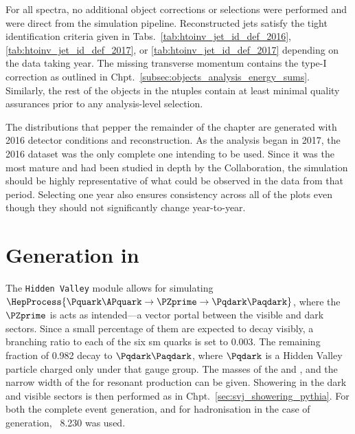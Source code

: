 For all spectra, no additional object corrections or selections were performed and were direct from the simulation pipeline. Reconstructed \glspl{jet} satisfy the tight identification criteria given in Tabs.~\ref{tab:htoinv_jet_id_def_2016}, \ref{tab:htoinv_jet_id_def_2017}, or \ref{tab:htoinv_jet_id_def_2017} depending on the data taking year. The missing transverse momentum \ptmiss contains the type-I correction as outlined in Chpt.~\ref{subsec:objects_analysis_energy_sums}. Similarly, the rest of the objects in the ntuples contain at least minimal quality assurances prior to any analysis-level selection.

The distributions that pepper the remainder of the chapter are generated with 2016 detector conditions and reconstruction. As the analysis began in 2017, the 2016 dataset was the only complete one intending to be used. Since it was the most mature and had been studied in depth by the Collaboration, the simulation should be highly representative of what could be observed in the data from that period. Selecting one year also ensures consistency across all of the plots even though they should not significantly change year-to-year.




\section{Generation in \texorpdfstring{\PYTHIA}{Pythia}}
\label{sec:svj_signal_pythia}

The \texttt{Hidden Valley} module allows for simulating $\HepProcess{\Pquark\APquark \to \PZprime \to \Pqdark\Paqdark}$, where the $\PZprime$ is acts as intended---a vector portal between the visible and dark sectors. Since a small percentage of them are expected to decay visibly, a branching ratio to each of the six \acrshort{sm} quarks is set to 0.003. The remaining fraction of 0.982 decay to $\Pqdark\Paqdark$, where $\Pqdark$ is a Hidden Valley particle charged only under that gauge group. The masses of the \PZprime and \Pqdark, and the narrow width of the \PZprime for resonant production can be given. Showering in the dark and visible sectors is then performed as in Chpt.~\ref{sec:svj_showering_pythia}. For both the complete event generation, and for hadronisation in the case of \MADGRAPH generation, \PYTHIA~8.230 was used.




